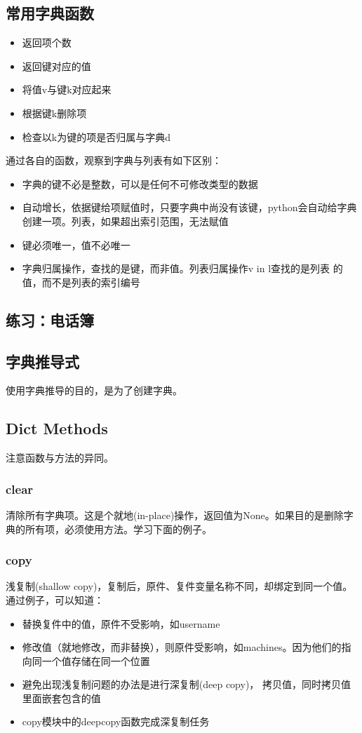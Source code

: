\subsection{常用字典函数}
\begin{itemize}
\item {} 返回项个数
\item {} 返回键对应的值
\item {} 将值v与键k对应起来
\item {} 根据键k删除项
\item {} 检查以k为键的项是否归属与字典d
\end{itemize}
通过各自的函数，观察到字典与列表有如下区别：
\begin{itemize}
\item 字典的键不必是整数，可以是任何不可修改类型的数据
\item 自动增长，依据键给项赋值时，只要字典中尚没有该键，python会自动给字典创建一项。列表，如果超出索引范围，无法赋值
\item 键必须唯一，值不必唯一
\item 字典归属操作，查找的是键，而非值。列表归属操作v in l查找的是列表
  的值，而不是列表的索引编号
\end{itemize}
\subsection{练习：电话簿}
\subsection{字典推导式}
使用字典推导的目的，是为了创建字典。
\subsection{Dict Methods}
注意函数与方法的异同。
\subsubsection{clear}
清除所有字典项。这是个就地(in-place)操作，返回值为None。如果目的是删除字典的所有项，必须使用方法。学习下面的例子。
\subsubsection{copy}
浅复制(shallow copy)，复制后，原件、复件变量名称不同，却绑定到同一个值。
通过例子，可以知道：
\begin{itemize}
\item 替换复件中的值，原件不受影响，如username
\item 修改值（就地修改，而非替换），则原件受影响，如machines。因为他们的指向同一个值存储在同一个位置
\item 避免出现浅复制问题的办法是进行深复制(deep copy)， 拷贝值，同时拷贝值里面嵌套包含的值
\item copy模块中的deepcopy函数完成深复制任务
\end{itemize}
